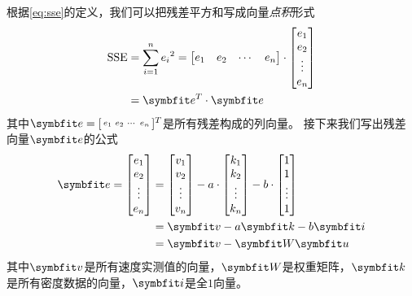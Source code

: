 根据\cref{eq:sse}的定义，我们可以把残差平方和写成向量\emph{点积}形式
\begin{equation}\label{eq:sse-vec}
    \begin{split}
        \text{SSE}&=\sum_{i=1}^n {e_i}^2=
        \begin{bmatrix}
            e_1 & e_2 &\cdots & e_n
        \end{bmatrix}
        \cdot
        \begin{bmatrix}
            e_1 \\
            e_2 \\
            \vdots\\
            e_n
        \end{bmatrix}\\
        &=\Ve^T\cdot\Ve
    \end{split}
\end{equation}
其中$\Ve=[\begin{smallmatrix}
    e_1 & e_2 & \cdots & e_n
\end{smallmatrix}]^T$是所有残差构成的列向量。
接下来我们写出残差向量$\Ve$的公式
\begin{equation}\label{eq:e-vec}
    \begin{split}
        \Ve=
        \begin{bmatrix}
            e_1 \\
            e_2 \\
            \vdots\\
            e_n
        \end{bmatrix}&=
        \begin{bmatrix}
            v_1 \\
            v_2 \\
            \vdots\\
            v_n
        \end{bmatrix}-
        a\cdot
        \begin{bmatrix}
            k_1 \\
            k_2 \\
            \vdots\\
            k_n
        \end{bmatrix}-
        b\cdot
        \begin{bmatrix}
            1 \\
            1 \\
            \vdots\\
            1
        \end{bmatrix}\\
        &=\Vv-a\Vk-b\Vi\\
        &=\Vv-\MW\Vu
    \end{split}
\end{equation}
其中$\Vv$是所有速度实测值的向量，$\MW$是权重矩阵，$\Vk$是所有密度数据的向量，$\Vi$是全$1$向量。


